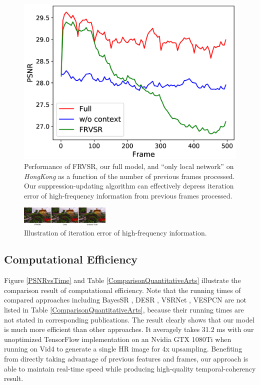 \documentclass[letterpaper]{article} %
\begin{document}
\vspace{-0.87mm}
\vspace{-1.74mm}
\begin{figure}[t]
\centering
\includegraphics[width=6.1 cm]{Fig11.png}
\caption{Performance of FRVSR, our full model, and ``only local network'' on \textit{HongKong} as a function of the number of previous frames processed. Our suppression-updating algorithm can effectively depress iteration error of high-frequency information from previous frames processed.}
\label{SuppressingCurve}
\end{figure}


\begin{figure}[t]
\centering
\includegraphics[width=4.284000000000001 cm,height=0.37in ]{Fig10.png}
\caption{Illustration of iteration error of high-frequency information.}
\label{SuppressingFigure}
\end{figure}



\subsection{Computational Efficiency}


Figure \ref{PSNRvsTime} and Table \ref{ComparisonQuantitativeArts} illustrate the comparison result of computational efficiency. Note that the running times of compared approaches including BayesSR \cite{BayesSR2011cvpr}, DESR \cite{DESR2015iccv}, VSRNet \cite{VSRNet2016TCT}, VESPCN \cite{VESPCN2017cvpr} are not listed in Table \ref{ComparisonQuantitativeArts}, because their running times are not stated in corresponding publications. The result clearly shows that our model is much more efficient than other approaches. It averagely takes 31.2 ms with our unoptimized TensorFlow implementation on an Nvidia GTX 1080Ti when running on Vid4 to generate a single HR image for 4x upsampling. Benefiting from directly taking advantage of previous features and frames, our approach is able to maintain real-time speed while producing high-quality temporal-coherency result.
\end{document}
